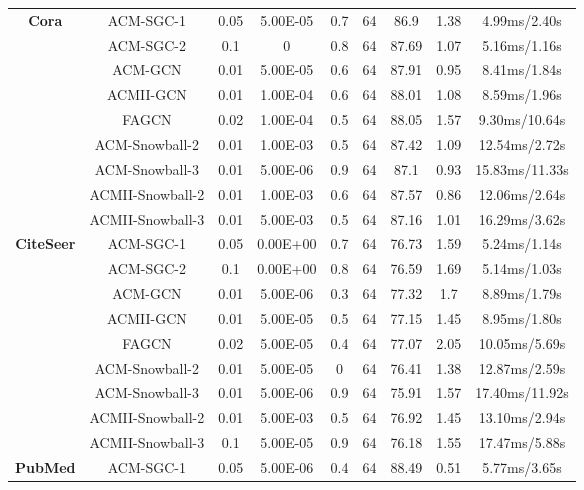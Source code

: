 \documentclass{article}
\newcommand{\0}{{\boldsymbol{0}}}
\newcommand{\6}{{\partial}}
\newcommand{\8}{{\infty}}
\newcommand{\4}{{\nabla}}
\begin{document}
\begin{table}[htbp]
{\begin{tabular}{c|c|ccccccc}
           \midrule
    \multirow{9}[0]{*}{\textbf{Cora}} & ACM-SGC-1 & 0.05  & 5.00E-05 & 0.7   & 64    & 86.9  & 1.38  & 4.99ms/2.40s \\
          & ACM-SGC-2 & 0.1   & 0     & 0.8   & 64    & 87.69 & 1.07  & 5.16ms/1.16s \\
          & ACM-GCN & 0.01  & 5.00E-05 & 0.6   & 64    & 87.91 & 0.95  & 8.41ms/1.84s \\
          & ACMII-GCN & 0.01  & 1.00E-04 & 0.6   & 64    & 88.01 & 1.08  & 8.59ms/1.96s \\
          & FAGCN & 0.02  & 1.00E-04 & 0.5   & 64    & 88.05 & 1.57  & 9.30ms/10.64s \\
          & ACM-Snowball-2 & 0.01  & 1.00E-03 & 0.5   & 64    & 87.42 & 1.09  & 12.54ms/2.72s \\
          & ACM-Snowball-3 & 0.01  & 5.00E-06 & 0.9   & 64    & 87.1  & 0.93  & 15.83ms/11.33s \\
          & ACMII-Snowball-2 & 0.01  & 1.00E-03 & 0.6   & 64    & 87.57 & 0.86  & 12.06ms/2.64s \\
          & ACMII-Snowball-3 & 0.01  & 5.00E-03 & 0.5   & 64    & 87.16 & 1.01  & 16.29ms/3.62s \\
           \midrule
    \multirow{9}[0]{*}{\textbf{CiteSeer}} & ACM-SGC-1 & 0.05  & 0.00E+00 & 0.7   & 64    & 76.73 & 1.59  & 5.24ms/1.14s \\
          & ACM-SGC-2 & 0.1   & 0.00E+00 & 0.8   & 64    & 76.59 & 1.69  & 5.14ms/1.03s \\
          & ACM-GCN & 0.01  & 5.00E-06 & 0.3   & 64    & 77.32 & 1.7   & 8.89ms/1.79s \\
          & ACMII-GCN & 0.01  & 5.00E-05 & 0.5   & 64    & 77.15 & 1.45  & 8.95ms/1.80s \\
          & FAGCN & 0.02  & 5.00E-05 & 0.4   & 64    & 77.07 & 2.05  & 10.05ms/5.69s \\
          & ACM-Snowball-2 & 0.01  & 5.00E-05 & 0     & 64    & 76.41 & 1.38  & 12.87ms/2.59s \\
          & ACM-Snowball-3 & 0.01  & 5.00E-06 & 0.9   & 64    & 75.91 & 1.57  & 17.40ms/11.92s \\
          & ACMII-Snowball-2 & 0.01  & 5.00E-03 & 0.5   & 64    & 76.92 & 1.45  & 13.10ms/2.94s \\
          & ACMII-Snowball-3 & 0.1   & 5.00E-05 & 0.9   & 64    & 76.18 & 1.55  & 17.47ms/5.88s \\
           \midrule
    \multirow{9}[1]{*}{\textbf{PubMed}} & ACM-SGC-1 & 0.05  & 5.00E-06 & 0.4   & 64    & 88.49 & 0.51  & 5.77ms/3.65s \\

\end{tabular}}
\end{table}
\end{document}

